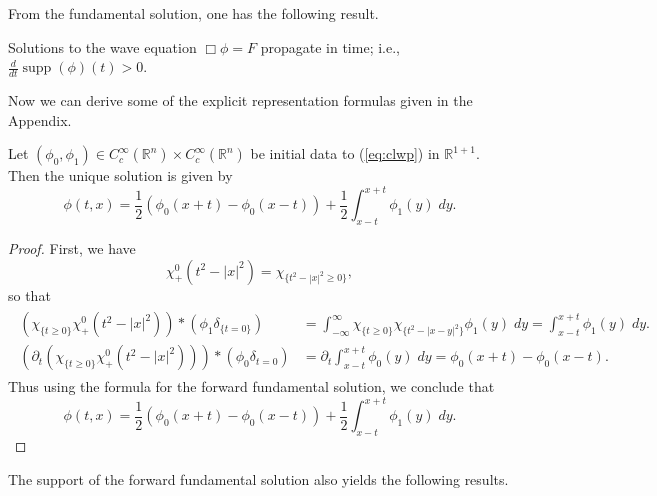 \documentclass{article}
\begin{document}
From the fundamental solution, one has the following result. 

\begin{corollary}
	Solutions to the wave equation $\Box \phi = F$ propagate in time; i.e., $\frac{d}{dt}\operatorname{supp}(\phi)(t) > 0$.  
	\label{cor:wave_prop}
\end{corollary} 


Now we can derive some of the explicit representation formulas given in the Appendix. 

\begin{prop}
	Let $(\phi_{0}, \phi_{1}) \in C_{c}^{\infty}(\mathbb{R}^{n}) \times C_{c}^{\infty}(\mathbb{R}^{n})$ be initial data to (\ref{eq:clwp}) in $\mathbb{R}^{1 + 1}$. Then the unique solution is given by 
	\begin{equation*}
		\phi(t, x) = \frac{1}{2}\left(\phi_{0}(x + t) - \phi_{0}(x - t)\right) + \frac{1}{2}\int_{x - t}^{x + t}\phi_{1}(y)\;dy. 
	\end{equation*}
\end{prop} 

\begin{proof}
	First, we have 
	\begin{equation*}
		\chi_{+}^{0}(t^{2} - |x|^{2}) = \chi_{\{t^{2} - |x|^{2} \geq 0\}}, 
	\end{equation*}
	so that 
	\begin{align*}
		\begin{split}
			(\chi_{\{t \geq 0\}}\chi_{+}^{0}(t^{2} - |x|^{2})) \ast (\phi_{1}\delta_{\{t = 0\}}) &= \int_{-\infty}^{\infty}\chi_{\{t \geq 0\}} \chi_{\{t^{2} - |x - y|^{2}\}}\phi_{1}(y)\;dy = \int_{x - t}^{x + t}\phi_{1}(y)\;dy. \\
			(\partial_{t}(\chi_{\{t \geq 0\}}\chi_{+}^{0}(t^{2} - |x|^{2}))) \ast (\phi_{0}\delta_{t = 0}) &= \partial_{t}\int_{x - t}^{x + t}\phi_{0}(y)\;dy = \phi_{0}(x + t) - \phi_{0}(x - t). 
		\end{split} 
	\end{align*}
	Thus using the formula for the forward fundamental solution, we conclude that 
	\begin{equation*}
		\phi(t, x) = \frac{1}{2}(\phi_{0}(x + t) - \phi_{0}(x - t)) + \frac{1}{2}\int_{x - t}^{x + t}\phi_{1}(y)\;dy. 
	\end{equation*}
\end{proof} 

The support of the forward fundamental solution also yields the following results. 
\end{document}
